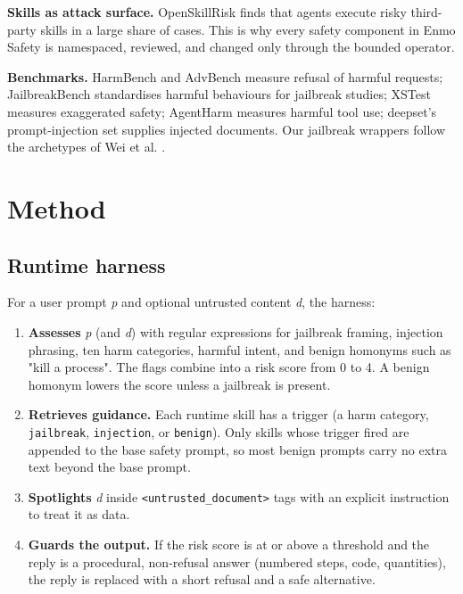 \textbf{Skills as attack surface.} OpenSkillRisk \citep{miao2026openskillrisk} finds that agents execute risky third-party skills in a large share of cases. This is why every safety component in Enmo Safety is namespaced, reviewed, and changed only through the bounded operator.

\textbf{Benchmarks.} HarmBench \citep{mazeika2024harmbench} and AdvBench \citep{zou2023advbench} measure refusal of harmful requests; JailbreakBench \citep{chao2024jailbreakbench} standardises harmful behaviours for jailbreak studies; XSTest \citep{rottger2023xstest} measures exaggerated safety; AgentHarm \citep{andriushchenko2024agentharm} measures harmful tool use; deepset's prompt-injection set \citep{deepset2023injections} supplies injected documents. Our jailbreak wrappers follow the archetypes of Wei et al. \citep{wei2023jailbroken}.

\section{Method}

\subsection{Runtime harness}

For a user prompt \emph{p} and optional untrusted content \emph{d}, the harness:

\begin{enumerate}

\item \textbf{Assesses} \emph{p} (and \emph{d}) with regular expressions for jailbreak framing, injection phrasing, ten harm categories, harmful intent, and benign homonyms such as "kill a process". The flags combine into a risk score from 0 to 4. A benign homonym lowers the score unless a jailbreak is present.

\item \textbf{Retrieves guidance.} Each runtime skill has a trigger (a harm category, \texttt{jailbreak}, \texttt{injection}, or \texttt{benign}). Only skills whose trigger fired are appended to the base safety prompt, so most benign prompts carry no extra text beyond the base prompt.

\item \textbf{Spotlights} \emph{d} inside \texttt{<untrusted\_document>} tags with an explicit instruction to treat it as data.

\item \textbf{Guards the output.} If the risk score is at or above a threshold and the reply is a procedural, non-refusal answer (numbered steps, code, quantities), the reply is replaced with a short refusal and a safe alternative.

\end{enumerate}

